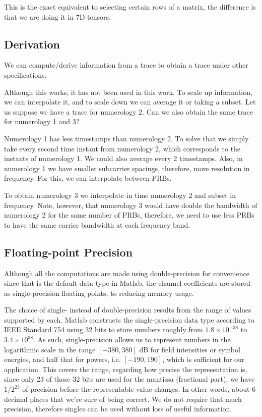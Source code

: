 This is the exact equivalent to selecting certain rows of a matrix, the difference is that we are doing it in 7D tensors.

\subsection*{Derivation}

We can compute/derive information from a trace to obtain a trace under other specifications.

Although this works, it has not been used in this work. To scale up information, we can interpolate it, and to scale down we can average it or taking a subset. Let us suppose we have a trace for numerology 2. Can we also obtain the same trace for numerology 1 and 3?

Numerology 1 has less timestamps than numerology 2. To solve that we simply take every second time instant from numerology 2, which corresponds to the instants of numerology 1. We could also average every 2 timestamps. Also, in numerology 1 we have smaller subcarrier spacings, therefore, more resolution in frequency. For this, we can interpolate between PRBs. 

To obtain numerology 3 we interpolate in time numerology 2 and subset in frequency. Note, however, that numerology 3 would have double the bandwidth of numerology 2 for the same number of PRBs, therefore, we need to use less PRBs to have the same carrier bandwidth at each frequency band.

\subsection*{Floating-point Precision}
Although all the computations are made using double-precision for convenience since that is the default data type in Matlab, the channel coefficients are stored as single-precision floating points, to reducing memory usage.

The choice of single- instead of double-precision results from the range of values supported by each. Matlab constructs the single-precision data type according to IEEE Standard 754 \cite{IEEE754} using 32 bits to store numbers roughly from $1.8 \times 10^{-38}$ to $3.4 \times 10^{38}$. As such, single-precision allows us to represent numbers in the logarithmic scale in the range $\left[-380, 380\right]$ dB for field intensities or symbol energies, and half that for powers, i.e. $\left[-190, 190\right]$, which is sufficient for our application. This covers the range, regarding how precise the representation is, since only 23 of those 32 bits are used for the mantissa (fractional part), we have $1 / 2^23$ of precision before the representable value changes. In other words, about 6 decimal places that we're sure of being correct. We do not require that much precision, therefore singles can be used without loss of useful information.

